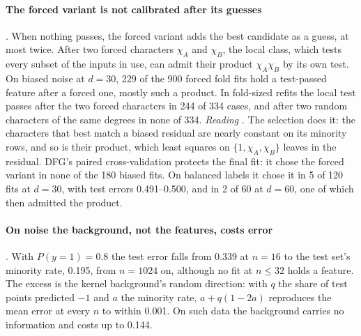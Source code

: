 \paragraph{The forced variant is not calibrated after its guesses} . When nothing passes, the forced variant adds the best candidate as a guess, at most twice. After two forced characters $\chi_A$ and $\chi_B$, the local class, which tests every subset of the inputs in use, can admit their product $\chi_A\chi_B$ by its own test. On biased noise at $d=30$, 229 of the 900 forced fold fits hold a test-passed feature after a forced one, mostly such a product. In fold-sized refits the local test passes after the two forced characters in 244 of 334 cases, and after two random characters of the same degrees in none of 334. \emph{Reading} . The selection does it: the characters that best match a biased residual are nearly constant on its minority rows, and so is their product, which least squares on $\{1,\chi_A,\chi_B\}$ leaves in the residual. DFG's paired cross-validation protects the final fit: it chose the forced variant in none of the 180 biased fits. On balanced labels it chose it in 5 of 120 fits at $d=30$, with test errors 0.491--0.500, and in 2 of 60 at $d=60$, one of which then admitted the product.

\paragraph{On noise the background, not the features, costs error} . With $P(y{=}1)=0.8$ the test error falls from 0.339 at $n=16$ to the test set's minority rate, 0.195, from $n=1024$ on, although no fit at $n\le32$ holds a feature. The excess is the kernel background's random direction: with $q$ the share of test points predicted $-1$ and $a$ the minority rate, $a+q(1-2a)$ reproduces the mean error at every $n$ to within 0.001. On such data the background carries no information and costs up to 0.144.

